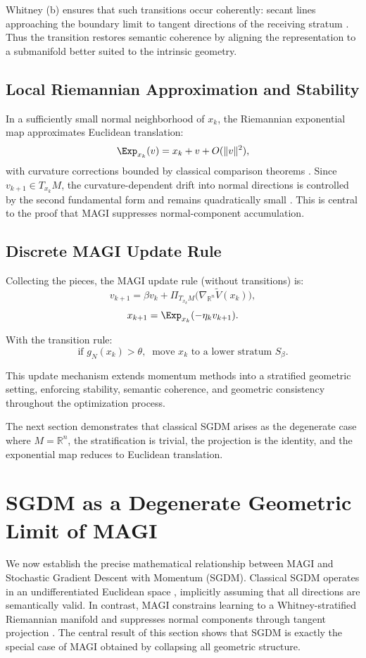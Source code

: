 \documentclass[12pt]{article}
\begin{document}
Whitney (b) ensures that such transitions occur coherently: secant lines approaching the boundary limit to tangent directions of the receiving stratum \citep{Whitney1965,Mather1973}. Thus the transition restores semantic coherence by aligning the representation to a submanifold better suited to the intrinsic geometry.

\subsection*{Local Riemannian Approximation and Stability}

In a sufficiently small normal neighborhood of $x_k$, the Riemannian exponential map approximates Euclidean translation:
\[
\Exp_{x_k}(v) = x_k + v + O(\|v\|^2),
\]
with curvature corrections bounded by classical comparison theorems \citep{Sakai1996}. Since $v_{k+1} \in T_{x_k}M$, the curvature-dependent drift into normal directions is controlled by the second fundamental form and remains quadratically small \citep{doCarmoRiemannian1992}. This is central to the proof that MAGI suppresses normal-component accumulation.

\subsection*{Discrete MAGI Update Rule}

Collecting the pieces, the MAGI update rule (without transitions) is:
\[
v_{k+1}
=
\beta v_k
+
\Pi_{T_{x_k}M}\big( \nabla_{\mathbb{R}^n}\widetilde{V}(x_k) \big),
\]
\[
x_{k+1}
=
\Exp_{x_k}(-\eta_k v_{k+1}).
\]

With the transition rule:
\[
\text{if } g_N(x_k) > \theta,\ \text{ move } x_k \text{ to a lower stratum } S_\beta.
\]

This update mechanism extends momentum methods into a stratified geometric setting, enforcing stability, semantic coherence, and geometric consistency throughout the optimization process.

The next section demonstrates that classical SGDM arises as the degenerate case where $M = \mathbb{R}^n$, the stratification is trivial, the projection is the identity, and the exponential map reduces to Euclidean translation.
\section{SGDM as a Degenerate Geometric Limit of MAGI}

We now establish the precise mathematical relationship between MAGI and Stochastic Gradient Descent with Momentum (SGDM). Classical SGDM operates in an undifferentiated Euclidean space \citep{Polyak1964,Sutskever2013}, implicitly assuming that all directions are semantically valid. In contrast, MAGI constrains learning to a Whitney-stratified Riemannian manifold \citep{Whitney1965,GoreskyMacPherson1988} and suppresses normal components through tangent projection \citep{doCarmoRiemannian1992}. The central result of this section shows that SGDM is exactly the special case of MAGI obtained by collapsing all geometric structure.
\end{document}
